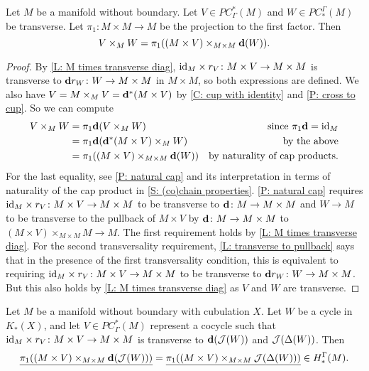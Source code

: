 \begin{lemma}\label{L: diagonal version of intersection}
	Let $M$ be a manifold without boundary.
	Let $V \in PC^*_\Gamma(M)$ and $W \in PC_*^\Gamma(M)$ be transverse.
	Let $\pi_1 \colon M \times M \to M$ be the projection to the first factor.
	Then $$V \times_M W = \pi_1((M \times V)\times_{M \times M} \mathbf{d}(W)).$$
\end{lemma}

\begin{proof}
	By \cref{L: M times transverse diag}, $\mathrm{id}_M \times r_V \colon M \times V \to M \times M$ is transverse to $\mathbf{d} r_W \colon W \to M \times M$ in $M \times M$, so both expressions are defined.
	We also have $V = M \times_M V = \mathbf{d}^*(M \times V)$ by \cref{C: cup with identity} and \cref{P: cross to cup}.
	So we can compute
	\begin{align*}
		V \times_M W& = \pi_1\mathbf{d} (V \times_M W)&\text{since $\pi_1\mathbf{d} = \mathrm{id}_M$}\\
		& = \pi_1\mathbf{d} (\mathbf{d}^*(M \times V) \times_M W)&\text{by the above}\\
		& = \pi_1((M \times V)\times_{M \times M}\mathbf{d}(W))&\text{by naturality of cap products.}
	\end{align*}
	For the last equality, see \cref{P: natural cap} and its interpretation in terms of naturality of the cap product in \cref{S: (co)chain properties}.
	\cref{P: natural cap} requires $\mathrm{id}_M \times r_V \colon M \times V \to M \times M$ to be transverse to $\mathbf{d} \colon M \to M \times M$ and $W \to M$ to be transverse to the pullback of $M \times V$ by $\mathbf{d} \colon M \to M \times M$ to
	$(M \times V)\times_{M \times M}M \to M$.
	The first requirement holds by \cref{L: M times transverse diag}.
	For the second transversality requirement, \cref{L: transverse to pullback} says that in the presence of the first transversality condition, this is equivalent to requiring $\mathrm{id}_M \times r_V \colon M \times V \to M \times M$ to be transverse to $\mathbf{d} r_W \colon W \to M \times M$.
	But this also holds by \cref{L: M times transverse diag} as $V$ and $W$ are transverse.
\end{proof}

\begin{lemma}\label{L: diagonal equivalence}
	Let $M$ be a manifold without boundary with cubulation $X$.
	Let $W$ be a cycle in $K_*(X)$, and let $V \in PC^*_\Gamma(M)$ represent a cocycle such that $\mathrm{id}_M \times r_V \colon M \times V \to M \times M$ is transverse to $\mathbf{d}(\mathcal{J}(W))$ and $\mathcal{J}(\Delta(W))$.
	Then $$\underline{\pi_1((M \times V) \times_{M \times M}\mathbf{d}(\mathcal{J}(W)))} = \underline{\pi_1( (M \times V)\times_{M \times M}\mathcal{J}(\Delta(W)))} \in H_*^\Gamma(M).$$
\end{lemma}

